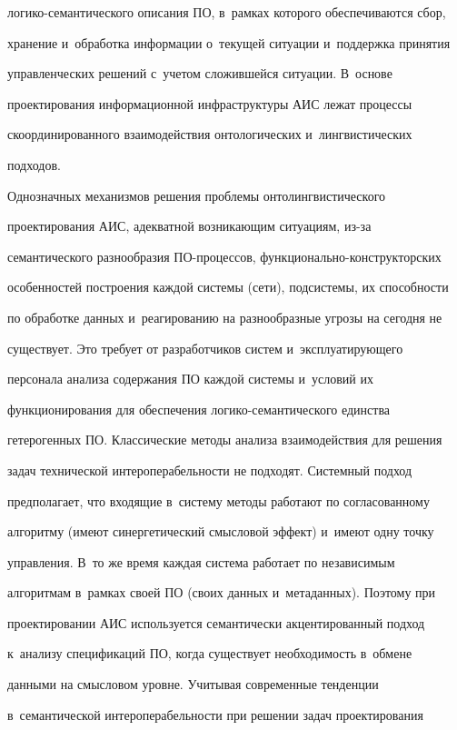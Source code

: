 логико-семантического описания ПО, в~рамках которого обеспечиваются сбор, 


хранение и~обработка информации о~текущей ситуации и~поддержка принятия 


управленческих решений с~учетом сложившейся ситуации. В~основе 


проектирования информационной инфраструктуры АИС лежат процессы 


скоординированного взаимодействия онтологических и~лингвистических 


подходов.


  


  Однозначных механизмов решения проблемы онтолингвистического 


проектирования АИС, адекватной возникающим ситуациям, из-за 


семантического разнообразия ПО-процессов, функционально-конструкторских 


особенностей построения каждой системы (сети), подсистемы, их способности 


по обработке данных и~реагированию на разнообразные угрозы на сегодня не 


существует. Это требует от разработчиков систем и~эксплуатирующего 


персонала анализа содержания ПО каждой системы и~условий их 


функционирования для обеспечения ло\-ги\-ко-се\-ман\-ти\-че\-ско\-го единства 


гетерогенных ПО. Классические методы анализа взаимодействия для решения 


задач технической интероперабельности не подходят. Системный подход 


предполагает, что входящие в~систему методы работают по согласованному 


алгоритму (имеют синергетический смысловой эффект) и~имеют одну точку 


управления. В~то же время каждая система работает по независимым 


алгоритмам в~рамках своей ПО (своих данных и~метаданных). Поэтому при 


проектировании АИС используется семантически акцентированный подход 


к~анализу спецификаций ПО, когда существует необходимость в~обмене 


данными на смысловом уровне. Учитывая современные тенденции 


в~семантической интероперабельности при решении задач проектирования 


